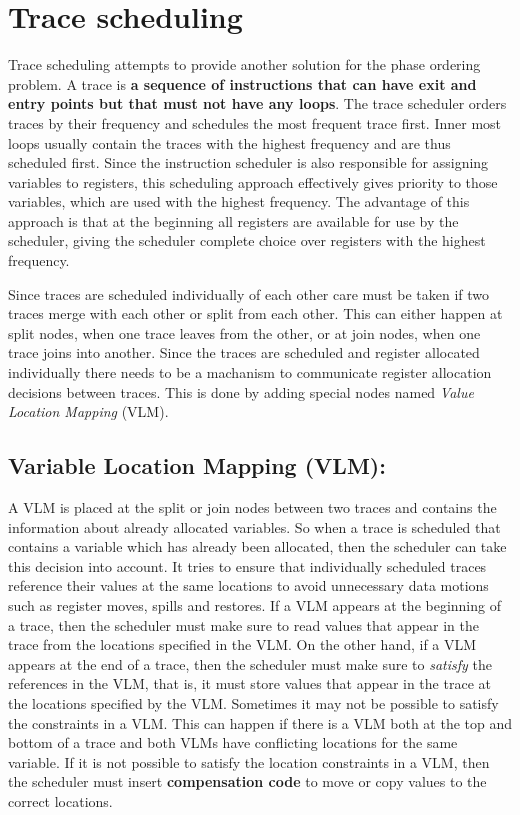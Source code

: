 \documentclass[a4paper,10pt]{article}
\begin{document}
\section{Trace scheduling}
Trace scheduling attempts to provide another solution for the phase ordering problem. A trace is \textbf{a sequence of instructions that 
can have exit and entry points but that must not have any loops}. The trace 
scheduler orders traces by their frequency and schedules the most frequent trace first. Inner most loops usually contain 
the traces with the highest frequency and are thus scheduled first. Since the instruction scheduler is also responsible for assigning 
variables to registers, this scheduling approach effectively gives priority to those variables, which are used with the highest frequency.
The advantage of this approach is that at the beginning all registers are available for use by the scheduler, giving the scheduler 
complete choice over registers with the highest frequency.

Since traces are scheduled individually of each other care must be taken if two traces merge with each other or split from each other.
This can either happen at split nodes, when one trace leaves from the other, or at join nodes, when one trace joins into another. Since 
the traces are scheduled and register allocated individually there needs to be a machanism to communicate register allocation decisions
between traces. This is done by adding special nodes named \textit{Value Location Mapping} (VLM).

\subsection{Variable Location Mapping (VLM):} 
A VLM is placed at the split or join nodes between two traces and contains the information about already allocated variables. So when a 
trace is scheduled that contains a variable which has already been allocated, then the scheduler can take this decision into account. It 
tries to ensure that individually scheduled traces reference their values at the same locations to avoid unnecessary data motions such as 
register moves, spills and restores. If a VLM appears at the beginning of a trace, then the scheduler must make sure to read values that 
appear in the trace from the locations specified in the VLM. On the other hand, if a VLM appears at the end of a trace, then the 
scheduler must make sure to \textit{satisfy} the references in the VLM, that is, it must store values that appear in the trace at the 
locations specified by the VLM. Sometimes it may not be possible to satisfy the constraints in a VLM. This can happen if there is a VLM 
both at the top and bottom of a trace and both VLMs have conflicting locations for the same variable. If it is not possible to satisfy 
the location constraints in a VLM, then the scheduler must insert \textbf{compensation code} to move or copy values to the correct 
locations.
\end{document}
